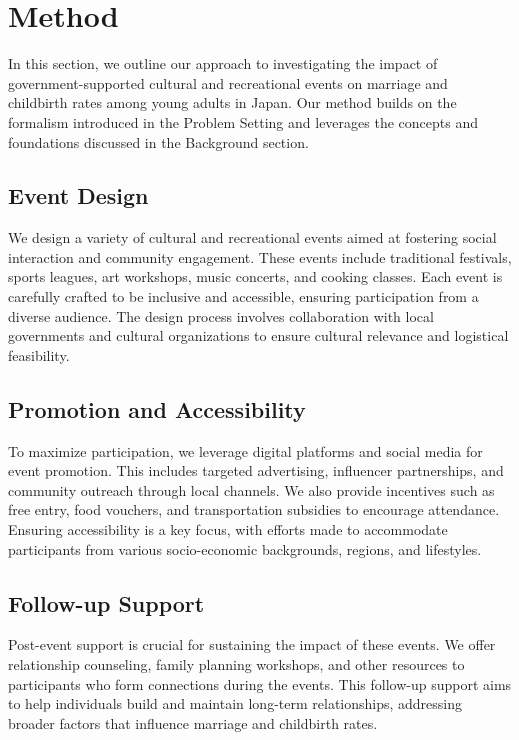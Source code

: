 \documentclass{article} %
\begin{document}
\section{Method}
\label{sec:method}

In this section, we outline our approach to investigating the impact of government-supported cultural and recreational events on marriage and childbirth rates among young adults in Japan. Our method builds on the formalism introduced in the Problem Setting and leverages the concepts and foundations discussed in the Background section.

\subsection{Event Design}
We design a variety of cultural and recreational events aimed at fostering social interaction and community engagement. These events include traditional festivals, sports leagues, art workshops, music concerts, and cooking classes. Each event is carefully crafted to be inclusive and accessible, ensuring participation from a diverse audience. The design process involves collaboration with local governments and cultural organizations to ensure cultural relevance and logistical feasibility.

\subsection{Promotion and Accessibility}
To maximize participation, we leverage digital platforms and social media for event promotion. This includes targeted advertising, influencer partnerships, and community outreach through local channels. We also provide incentives such as free entry, food vouchers, and transportation subsidies to encourage attendance. Ensuring accessibility is a key focus, with efforts made to accommodate participants from various socio-economic backgrounds, regions, and lifestyles.

\subsection{Follow-up Support}
Post-event support is crucial for sustaining the impact of these events. We offer relationship counseling, family planning workshops, and other resources to participants who form connections during the events. This follow-up support aims to help individuals build and maintain long-term relationships, addressing broader factors that influence marriage and childbirth rates.
\end{document}
